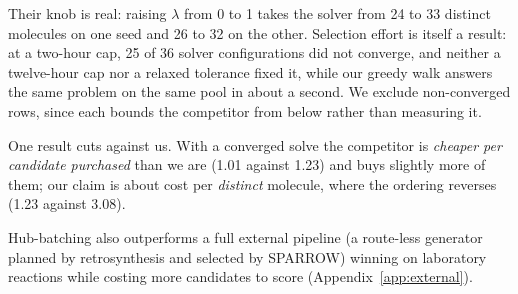 \documentclass{article}
\newcommand{\checkval}[1]{#1}
\begin{document}
Their knob is real: raising $\lambda$ from 0 to 1 takes the solver from \checkval{24} to \checkval{33} distinct molecules on one seed and \checkval{26} to \checkval{32} on the other. Selection effort is itself a result:
at a two-hour cap, \checkval{25 of 36} solver configurations did not converge, and neither a twelve-hour cap nor a relaxed tolerance fixed it, while our greedy walk answers the same problem on the same pool in about a second. We exclude non-converged rows, since each bounds the competitor from below rather than measuring it.

One result cuts against us. With a converged solve the competitor is \emph{cheaper per candidate purchased} than we are (\checkval{1.01} against \checkval{1.23}) and buys slightly more of them; our claim is about cost per \emph{distinct} molecule, where the ordering reverses (\checkval{1.23} against \checkval{3.08}).

Hub-batching also outperforms a full external pipeline (a route-less generator
\citep{kim2026s3gfn} planned by retrosynthesis and selected by SPARROW) winning
on laboratory reactions while costing more candidates to score
(Appendix~\ref{app:external}).



\end{document}
